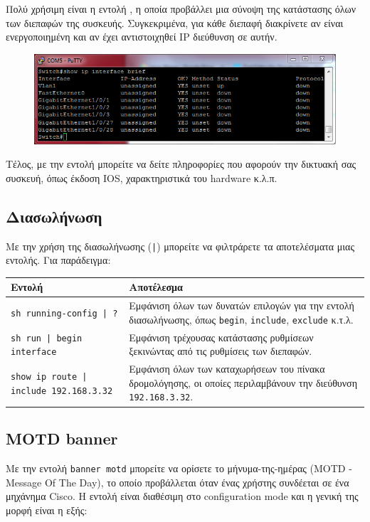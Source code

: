 \documentclass[12pt]{article}
\begin{document}
Πολύ χρήσιμη είναι η εντολή , η οποία προβάλλει μια σύνοψη της κατάστασης όλων των διεπαφών της συσκευής. Συγκεκριμένα, για κάθε διεπαφή διακρίνετε αν είναι ενεργοποιημένη και αν έχει αντιστοιχηθεί IP διεύθυνση σε αυτήν.
\begin{figure}[H]
	\centering
	\includegraphics[scale=.75]{show-ip-brief}
\end{figure}

Τέλος, με την εντολή  μπορείτε να δείτε πληροφορίες που αφορούν την δικτυακή σας συσκευή, όπως έκδοση IOS, χαρακτηριστικά του hardware κ.λ.π.

\subsection{Διασωλήνωση}
Με την χρήση της διασωλήνωσης (\texttt{|}) μπορείτε να φιλτράρετε τα αποτελέσματα μιας εντολής. Για παράδειγμα:\\[0.25cm]
\begin{tabular}{lp{8cm}}
	\textbf{Εντολή} & \textbf{Αποτέλεσμα} \\\hline
	\texttt{sh running-config | ?} & Εμφάνιση όλων των δυνατών επιλογών για την εντολή διασωλήνωσης, όπως \texttt{begin}, \texttt{include}, \texttt{exclude} κ.τ.λ. \\[0.25cm]
	\texttt{sh run | begin interface} & Εμφάνιση τρέχουσας κατάστασης ρυθμίσεων ξεκινώντας από τις ρυθμίσεις των διεπαφών.\\[0.25cm]
	\texttt{show ip route | include 192.168.3.32} & Εμφάνιση όλων των καταχωρήσεων του πίνακα δρομολόγησης, οι οποίες περιλαμβάνουν την διεύθυνση \texttt{192.168.3.32}.
\end{tabular}

\subsection{MOTD banner}

Με την εντολή \texttt{banner motd} μπορείτε να ορίσετε το μήνυμα-της-ημέρας (MOTD - Message Of The Day), το οποίο προβάλλεται όταν ένας χρήστης συνδέεται σε ένα μηχάνημα Cisco. Η εντολή είναι διαθέσιμη στο configuration mode και η γενική της μορφή είναι η εξής:\\
\end{document}
